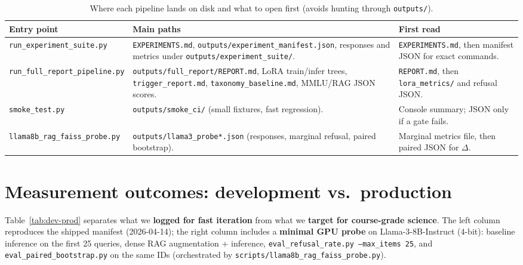 \documentclass[11pt,a4paper]{article}
\begin{document}
\begin{table}[ht]
\centering
\footnotesize
\setlength{\tabcolsep}{5pt}
\renewcommand{\arraystretch}{1.22}
\caption{Where each pipeline lands on disk and what to open first (avoids hunting through \texttt{outputs/}).}
\label{tab:report-map}
\begingroup
{}
\begin{tabularx}{\linewidth}{>{\raggedright\arraybackslash}p{3.15cm} >{\raggedright\arraybackslash}X >{\raggedright\arraybackslash}X}
\toprule
\rowcolor{tblhead}
\textbf{Entry point} & \textbf{Main paths} & \textbf{First read} \\
\midrule
\texttt{run\_experiment\_suite.py} &
  \texttt{EXPERIMENTS.md}, \texttt{outputs/experiment\_manifest.json}, responses and metrics under \texttt{outputs/experiment\_suite/}. &
  \texttt{EXPERIMENTS.md}, then manifest JSON for exact commands. \\
\texttt{run\_full\_report\_pipeline.py} &
  \texttt{outputs/full\_report/REPORT.md}, LoRA train/infer trees, \texttt{trigger\_report.md}, \texttt{taxonomy\_baseline.md}, MMLU/RAG JSON scores. &
  \texttt{REPORT.md}, then \texttt{lora\_metrics/} and refusal JSON. \\
\texttt{smoke\_test.py} &
  \texttt{outputs/smoke\_ci/} (small fixtures, fast regression). &
  Console summary; JSON only if a gate fails. \\
\texttt{llama8b\_rag\_faiss\_probe.py} &
  \texttt{outputs/llama3\_probe*.json} (responses, marginal refusal, paired bootstrap). &
  Marginal metrics file, then paired JSON for $\Delta$. \\
\bottomrule
\end{tabularx}
\endgroup
\end{table}

\section[Measurement outcomes]{Measurement outcomes: development vs.\ production}
\label{sec:empirical}

Table~\ref{tab:dev-prod} separates what we \textbf{logged for fast iteration} from what we \textbf{target for course-grade science}.
The left column reproduces the shipped manifest (2026-04-14); the right column includes a \textbf{minimal GPU probe} on Llama-3-8B-Instruct (4-bit): baseline inference on the first 25 queries, dense RAG augmentation + inference, \texttt{eval\_refusal\_rate.py --max\_items 25}, and \texttt{eval\_paired\_bootstrap.py} on the same IDs (orchestrated by \texttt{scripts/llama8b\_rag\_faiss\_probe.py}).
\end{document}
